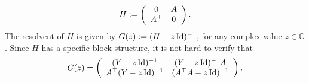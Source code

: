  \begin{equation}\label{linearize_block}
    H \define \left( {\begin{array}{*{20}c}
   0 & A  \\
   A^{\top} & 0
   \end{array}} \right).
 \end{equation}
The resolvent of $H$ is given by $G(z) := (H - z\operatorname{Id})^{-1}$, for any complex value $z\in \mathbb C$.  %
Since $H$ has a specific block structure, it is not hard to verify that %
	\begin{equation*} %
	  G(z) =  \left( {\begin{array}{*{20}c}
			(Y - z\id)^{-1} & (Y - z\id)^{-1} A  \\
      A^\top (Y - z\id)^{-1} & (A^\top A - z\id)^{-1}
		\end{array}} \right).%
  \end{equation*}

